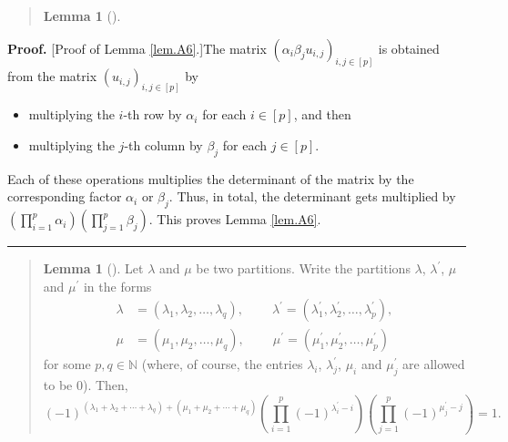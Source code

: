 \documentclass[numbers=enddot,12pt,final,onecolumn,notitlepage]{scrartcl}%
\newenvironment{statement}{\begin{quote}}{\end{quote}}
\theoremstyle{definition}
\newtheorem{lem}[theo]{Lemma}
\newenvironment{lemmain}[1][]
{\begin{statement}\begin{lem}[#1]}
{\end{lem}\end{statement}}
\newenvironment{proof}[1][Proof]{\noindent\textbf{#1.} }{\ \rule{0.5em}{0.5em}}
\newenvironment{lemmain}[1][Proof]{\noindent\textbf{#1.} }{\ \rule{0.5em}{0.5em}}
\let\prodnonlimits\prod
\renewcommand{\prod}{\prodnonlimits\limits}
\begin{document}
\begin{enumerate}
\begin{lemmain}
\end{lemmain}

\begin{proof}
[Proof of Lemma \ref{lem.A6}.]The matrix $\left(  \alpha_{i}\beta_{j}%
u_{i,j}\right)  _{i,j\in\left[  p\right]  }$ is obtained from the matrix
$\left(  u_{i,j}\right)  _{i,j\in\left[  p\right]  }$ by

\begin{itemize}
\item multiplying the $i$-th row by $\alpha_{i}$ for each $i\in\left[
p\right]  $, and then

\item multiplying the $j$-th column by $\beta_{j}$ for each $j\in\left[
p\right]  $.
\end{itemize}

Each of these operations multiplies the determinant of the matrix by the
corresponding factor $\alpha_{i}$ or $\beta_{j}$. Thus, in total, the
determinant gets multiplied by $\left(  \prod_{i=1}^{p}\alpha_{i}\right)
\left(  \prod_{j=1}^{p}\beta_{j}\right)  $. This proves Lemma \ref{lem.A6}.
\end{proof}

\begin{lemmain}
\label{lem.A6prods}Let $\lambda$ and $\mu$ be two partitions. Write the
partitions $\lambda$, $\lambda^{\prime}$, $\mu$ and $\mu^{\prime}$ in the
forms%
\begin{align*}
\lambda &  =\left(  \lambda_{1},\lambda_{2},\ldots,\lambda_{q}\right)
,\ \ \ \ \ \ \ \ \ \ \lambda^{\prime}=\left(  \lambda_{1}^{\prime},\lambda
_{2}^{\prime},\ldots,\lambda_{p}^{\prime}\right)  ,\\
\mu &  =\left(  \mu_{1},\mu_{2},\ldots,\mu_{q}\right)
,\ \ \ \ \ \ \ \ \ \ \mu^{\prime}=\left(  \mu_{1}^{\prime},\mu_{2}^{\prime
},\ldots,\mu_{p}^{\prime}\right)
\end{align*}
for some $p,q\in\mathbb{N}$ (where, of course, the entries $\lambda_{i}$,
$\lambda_{j}^{\prime}$, $\mu_{i}$ and $\mu_{j}^{\prime}$ are allowed to be
$0$). Then,%
\[
\left(  -1\right)  ^{\left(  \lambda_{1}+\lambda_{2}+\cdots+\lambda
_{q}\right)  +\left(  \mu_{1}+\mu_{2}+\cdots+\mu_{q}\right)  }\left(
\prod_{i=1}^{p}\left(  -1\right)  ^{\lambda_{i}^{\prime}-i}\right)  \left(
\prod_{j=1}^{p}\left(  -1\right)  ^{\mu_{j}^{\prime}-j}\right)  =1.
\]

\end{lemmain}


\end{enumerate}
\end{document}
